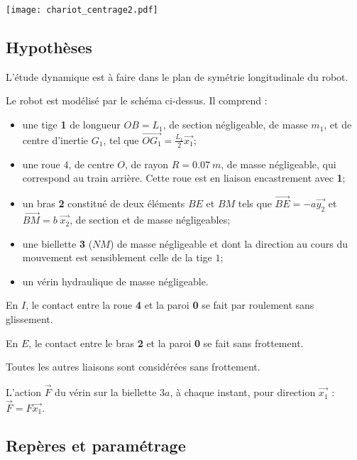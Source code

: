 \begin{marginfigure}
\texttt{[image: chariot\_centrage2.pdf]}
\end{marginfigure}
\fi

\subsection*{Hypothèses}
\ifprof
\else

L'étude dynamique est à faire dans le plan de symétrie longitudinale du robot.

Le robot est modélisé par le schéma ci-dessus. Il comprend :
\begin{itemize}
\item une tige \textbf{1} de longueur $OB=L_1$, de section négligeable, de masse $m_1$, et de centre d'inertie $G_1$, tel que $\overrightarrow{OG_1}=\frac{L_1}{2}\overrightarrow{x_1}$;
\item une roue $4$, de centre $O$, de rayon $R = \SI{0,07}{m}$, de masse négligeable, qui
correspond au train arrière. Cette roue est en liaison encastrement avec \textbf{1};
\item un bras \textbf{2} constitué de deux éléments $BE$ et $BM$ tels que $\overrightarrow{BE}=-a\overrightarrow{y_2}$ et $\overrightarrow{BM}=b\;\overrightarrow{x_2}$, de section et de masse négligeables;
\item une biellette \textbf{3} ($NM$) de masse négligeable et dont la direction au cours
du mouvement est sensiblement celle de la tige $1$;
\item un vérin hydraulique de masse négligeable.
\end{itemize}

 En $I$, le contact entre la roue \textbf{4} et la paroi \textbf{0} se fait par roulement sans glissement.

 En $E$, le contact entre le bras \textbf{2} et la paroi \textbf{0} se fait sans frottement.

Toutes les autres liaisons sont considérées sans frottement.

 L'action $\overrightarrow{F}$ du vérin sur la biellette $3a$, à chaque instant, pour direction $\overrightarrow{x_1}$ : 
$\overrightarrow{F} = F \overrightarrow{x_1}.$

\fi

\subsection*{Repères et paramétrage}
\ifprof
\else

